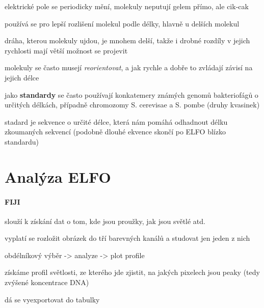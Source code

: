 \documentclass[DIV=8]{scrreprt}
\begin{document}
\begin{myItemize}[nosep]
    \item elektrické pole se periodicky mění, molekuly neputují gelem přímo, ale cik-cak
    \item používá se pro lepší rozlišení molekul podle délky, hlavně u delších molekul
\begin{myItemize}[nosep]
    \item dráha, kterou molekuly ujdou, je mnohem delší, takže i drobné rozdíly v jejich rychlosti mají větší možnost se projevit
    \item molekuly se často musejí \emph{reorientovat}, a jak rychle a dobře to zvládají závisí na jejich délce
\end{myItemize}

    \item jako \textbf{standardy} se často používají konkatemery známých genomů bakteriofágů o určitých délkách, případně chromozomy S. cerevisae a S. pombe (druhy kvasinek)
\begin{myItemize}[nosep]
    \item stadard je sekvence o určité délce, která nám pomáhá odhadnout délku zkoumaných sekvencí (podobně dlouhé ekvence skončí po ELFO blízko standardu)
\end{myItemize}

\end{myItemize}



\section{Analýza ELFO} \label{Analýza ELFO} \FloatBarrier



\paragraph{FIJI}
\begin{myItemize}[nosep]
    \item slouží k získání dat o tom, kde jsou proužky, jak jsou světlé atd.
    \item vyplatí se rozložit obrázek do tří barevných kanálů a studovat jen jeden z nich
    \item obdélníkový výběr -> analyze -> plot profile
\begin{myItemize}[nosep]
    \item získáme profil světlosti, ze kterého jde zjistit, na jakých pixelech jsou peaky (tedy zvýšené koncentrace DNA)
    \item dá se vyexportovat do tabulky
\end{myItemize}

\end{myItemize}
\end{document}
